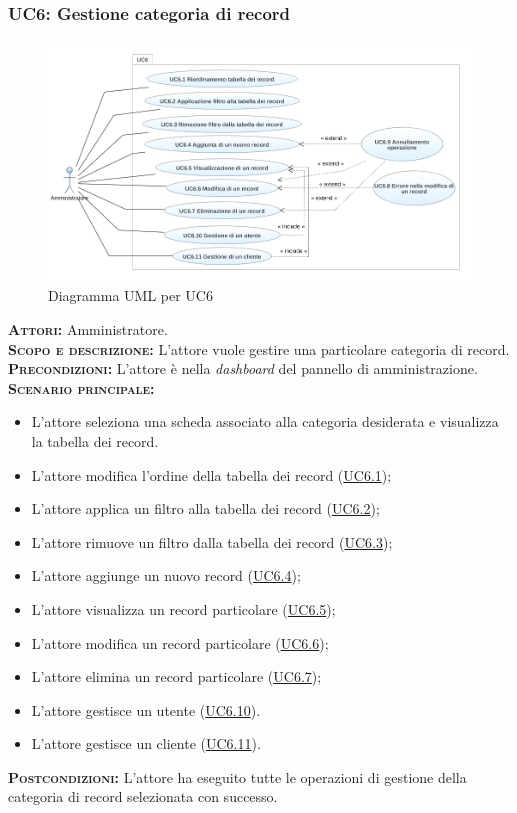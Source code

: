 \subsubsection{UC6: Gestione categoria di record}
\label{sec:UC6}
\begin{figure}[h!]
    \centering
    \includegraphics[width=\textwidth]{figures/uc/uc6.png}
    \caption[Diagramma UML per UC6]{Diagramma UML per UC6
    \label{fig:uc6}}
\end{figure}
\textsc{\textbf{Attori:}} Amministratore.\\
\textsc{\textbf{Scopo e descrizione:}} L'attore vuole gestire una particolare categoria di record.\\
\textsc{\textsc{\textbf{Precondizioni:}}} L'attore è nella \textit{dashboard} del pannello di amministrazione.\\
\textsc{\textbf{Scenario principale:}} 
\begin{itemize}
    \item L'attore seleziona una scheda associato alla categoria desiderata e visualizza la tabella dei record.
    \item L'attore modifica l'ordine della tabella dei record (\hyperref[sec:UC61]{UC6.1});
    \item L'attore applica un filtro alla tabella dei record (\hyperref[sec:UC62]{UC6.2});
    \item L'attore rimuove un filtro dalla tabella dei record (\hyperref[sec:UC63]{UC6.3});
    \item L'attore aggiunge un nuovo record (\hyperref[sec:UC64]{UC6.4});
    \item L'attore visualizza un record particolare (\hyperref[sec:UC65]{UC6.5});
    \item L'attore modifica un record particolare (\hyperref[sec:UC66]{UC6.6});
    \item L'attore elimina un record particolare (\hyperref[sec:UC67]{UC6.7});
    \item L'attore gestisce un utente (\hyperref[sec:UC610]{UC6.10}).
    \item L'attore gestisce un cliente (\hyperref[sec:UC611]{UC6.11}).
\end{itemize}
\textsc{\textbf{Postcondizioni:}} L'attore ha eseguito tutte le operazioni di gestione della categoria di record selezionata con successo.

